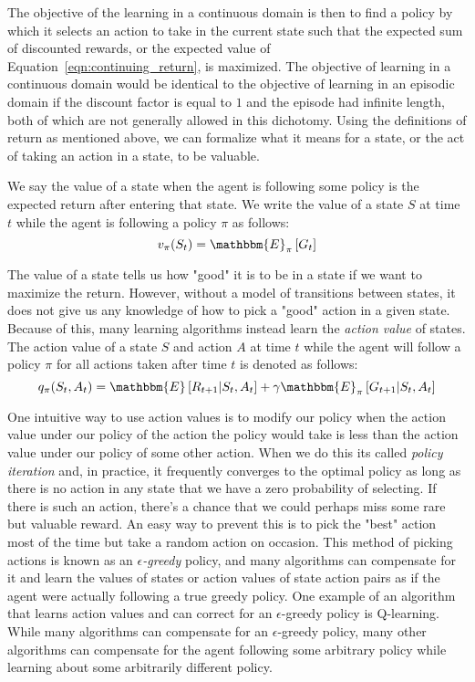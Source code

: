 \documentclass[../main.tex]{subfiles}
\begin{document}
The objective of the learning in a continuous domain is then to find a policy by which it selects an action to take in the current state such that the expected sum of discounted rewards, or the expected value of Equation~\ref{eqn:continuing_return}, is maximized. The objective of learning in a continuous domain would be identical to the objective of learning in an episodic domain if the discount factor is equal to $1$ and the episode had infinite length, both of which are not generally allowed in this dichotomy. Using the definitions of return as mentioned above, we can formalize what it means for a state, or the act of taking an action in a state, to be valuable.

We say the value of a state when the agent is following some policy is the expected return after entering that state. We write the value of a state $S$ at time $t$ while the agent is following a policy $\pi$ as follows:
\begin{equation}
    \label{eqn:state_value}
    v_\pi(S_t) = \mathbbm{E}_\pi \left[G_t\right]
\end{equation}

The value of a state tells us how "good" it is to be in a state if we want to maximize the return. However, without a model of transitions between states, it does not give us any knowledge of how to pick a "good" action in a given state. Because of this, many learning algorithms instead learn the \textit{action value} of states. The action value of a state $S$ and action $A$ at time $t$ while the agent will follow a policy $\pi$ for all actions taken after time $t$ is denoted as follows:
\begin{equation}
    \label{eqn:action_value}
    q_\pi(S_t, A_t) = \mathbbm{E} \left[R_{t + 1} | S_t, A_t\right] + \gamma \mathbbm{E}_\pi \left[G_{t + 1} | S_t, A_t\right]
\end{equation}

One intuitive way to use action values is to modify our policy when the action value under our policy of the action the policy would take is less than the action value under our policy of some other action. When we do this its called \textit{policy iteration} and, in practice, it frequently converges to the optimal policy as long as there is no action in any state that we have a zero probability of selecting. If there is such an action, there's a chance that we could perhaps miss some rare but valuable reward. An easy way to prevent this is to pick the "best" action most of the time but take a random action on occasion. This method of picking actions is known as an \textit{$\epsilon$-greedy} policy, and many algorithms can compensate for it and learn the values of states or action values of state action pairs as if the agent were actually following a true greedy policy. One example of an algorithm that learns action values and can correct for an $\epsilon$-greedy policy is Q-learning. While many algorithms can compensate for an $\epsilon$-greedy policy, many other algorithms can compensate for the agent following some arbitrary policy while learning about some arbitrarily different policy.
\end{document}
